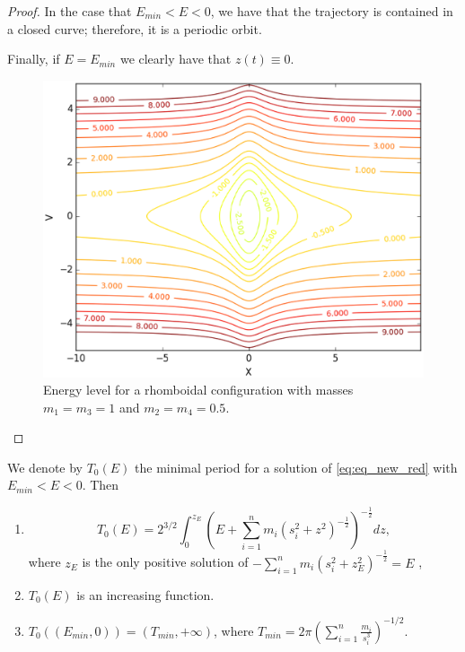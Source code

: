 \documentclass[smallcondensed]{svjour3}
\begin{document}
\begin{proof}
In the case that $E_{min}<E<0$, we have that the trajectory is contained in a closed curve; therefore, it is a periodic orbit.

Finally, if $E=E_{min}$  we clearly have that $z(t)\equiv 0$.
\begin{figure}[h]
\begin{center}
\includegraphics[scale=0.3]{figure_1.eps}
\caption{Energy level for a rhomboidal configuration with masses $m_1=m_3=1$ and $m_2=m_4=0.5$.}\label{fig:energy}
\end{center}
\end{figure}
\end{proof}

\begin{theorem}\label{thm:prop.periodos}
We denote by $T_0(E)$ the minimal period for a solution of \eqref{eq:eq_new_red} with $E_{min}<E<0$. Then
\begin{enumerate}
 \item\label{it:T0.formula} 
 \begin{equation}\label{eq:form.T0E-periodo}
 T_0(E)=2^{3/2}\int_{0}^{z_E} \left(E+\sum_{i=1}^n m_i (s_i^2+z^2)^{-\frac12}\right)^{-\frac12} dz,
 \end{equation}
 where $z_E$ is the only positive solution of $-\sum_{i=1}^n m_i (s_i^2+z_{E}^2)^{-\frac12}=E$ ,
 \item\label{it:T0.creciente} $T_0(E)$ is an increasing function.
 \item\label{it:T0.rango} $T_0\left((E_{min},0)\right)=(T_{min},+\infty)$, where  $T_{min}=2\pi\left(\sum_{i=1}^n\frac{m_i}{s_i^3} \right)^{-1/2}$.

 \end{enumerate}
\end{theorem}
\end{document}
